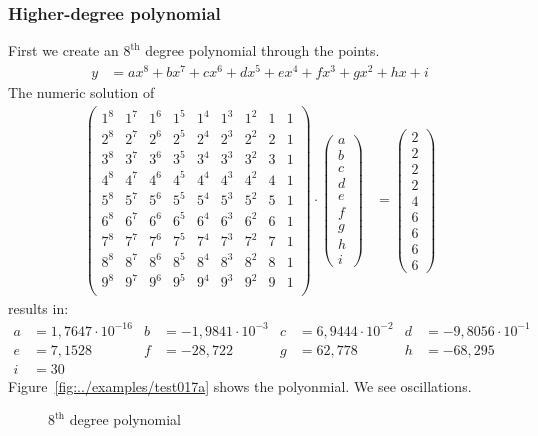 \documentclass[origlongtable]{scrartcl}
\newcommand{\includepgfimage}[2]{%
\begin{figure}%
{\centering%
\caption{#2}\label{fig:#1}%
}%
\end{figure}%
}
\begin{document}
\subsubsection{Higher-degree polynomial}
First we create an \(8^{\text{th}}\) degree polynomial through the points.
\begin{align*}
y&=ax^8+bx^7+cx^6+dx^5+ex^4+fx^3+gx^2+hx+i
\end{align*}
The numeric solution of
\begin{align*}
\left(\begin{array}{ccccccccc}
1^8&1^7&1^6&1^5&1^4&1^3&1^2&1&1\\
2^8&2^7&2^6&2^5&2^4&2^3&2^2&2&1\\
3^8&3^7&3^6&3^5&3^4&3^3&3^2&3&1\\
4^8&4^7&4^6&4^5&4^4&4^3&4^2&4&1\\
5^8&5^7&5^6&5^5&5^4&5^3&5^2&5&1\\
6^8&6^7&6^6&6^5&6^4&6^3&6^2&6&1\\
7^8&7^7&7^6&7^5&7^4&7^3&7^2&7&1\\
8^8&8^7&8^6&8^5&8^4&8^3&8^2&8&1\\
9^8&9^7&9^6&9^5&9^4&9^3&9^2&9&1\\
\end{array}\right)\cdot\left(\begin{array}{c}a\\b\\c\\d\\e\\f\\g\\h\\i\end{array}\right)&=\left(\begin{array}{c}2\\2\\2\\2\\4\\6\\6\\6\\6\end{array}\right)
\end{align*}
results in:
\begin{align*}
a&=1,7647\cdot{}{10}^{-16}&b&=-1,9841\cdot{}{10}^{-3}&c&=6,9444\cdot{}{10}^{-2}&d&=-9,8056\cdot{}{10}^{-1}\\[0.2em]
e&=7,1528&f&=-28,722&g&=62,778&h&=-68,295\\[0.2em]
i&=30
\end{align*}
Figure~\vref{fig:../examples/test017a}
shows the polyonmial. We see oscillations.
\clearpage
\includepgfimage{../examples/test017a}{\(8^{\text{th}}\) degree polynomial}
\clearpage
\end{document}
